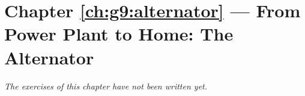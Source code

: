 \section*{Chapter \ref{ch:g9:alternator} --- From Power Plant to Home: The Alternator}


\emph{The exercises of this chapter have not been written yet.}
